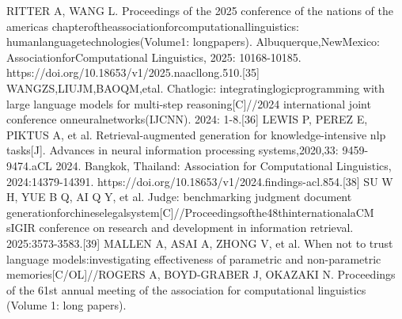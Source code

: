 \documentclass[12pt,a4paper,openright,UTF8]{ctexbook}
\begin{document}
RITTER A, WANG L. Proceedings of the 2025 conference of the nations of the americas chapteroftheassociationforcomputationallinguistics: humanlanguagetechnologies(Volume1: longpapers). Albuquerque,NewMexico: AssociationforComputational Linguistics, 2025: 10168-10185. https://doi.org/10.18653/v1/2025.naacllong.510.[35] WANGZS,LIUJM,BAOQM,etal. Chatlogic: integratinglogicprogramming with large language models for multi-step reasoning[C]//2024 international joint conference onneuralnetworks(IJCNN). 2024: 1-8.[36] LEWIS P, PEREZ E, PIKTUS A, et al. Retrieval-augmented generation for knowledge-intensive nlp tasks[J]. Advances in neural information processing systems,2020,33: 9459-9474.aCL 2024. Bangkok, Thailand: Association for Computational Linguistics, 2024:14379-14391. https://doi.org/10.18653/v1/2024.findings-acl.854.[38] SU W H, YUE B Q, AI Q Y, et al. Judge: benchmarking judgment document generationforchineselegalsystem[C]//Proceedingsofthe48thinternationalaCM sIGIR conference on research and development in information retrieval. 2025:3573-3583.[39] MALLEN A, ASAI A, ZHONG V, et al. When not to trust language models:investigating effectiveness of parametric and non-parametric memories[C/OL]//ROGERS A, BOYD-GRABER J, OKAZAKI N. Proceedings of the 61st annual meeting of the association for computational linguistics (Volume 1: long papers).
\end{document}
